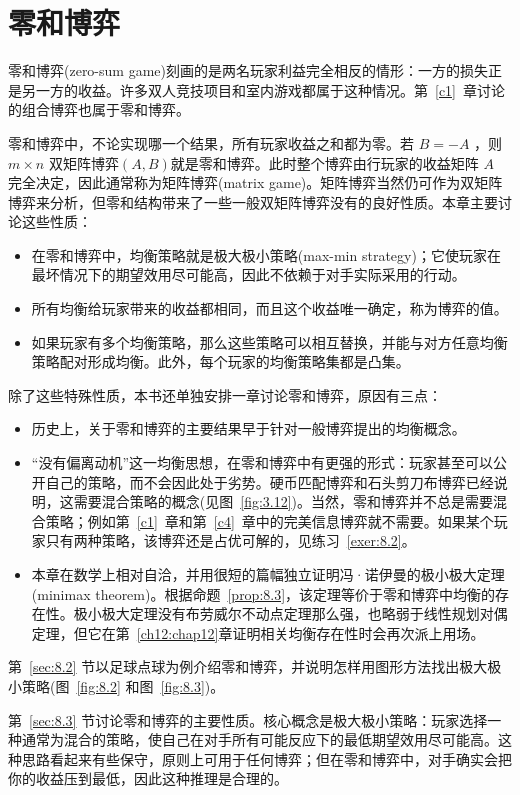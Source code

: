 \chapter{零和博弈} \label{c8}
零和博弈(zero-sum game)刻画的是两名玩家利益完全相反的情形：一方的损失正是另一方的收益。许多双人竞技项目和室内游戏都属于这种情况。第~\ref{c1}~章讨论的组合博弈也属于零和博弈。

零和博弈中，不论实现哪一个结果，所有玩家收益之和都为零。若 \(B=-A\) ，则 \(m \times  n\) 双矩阵博弈$ (A, B) $就是零和博弈。此时整个博弈由行玩家的收益矩阵 \(A\) 完全决定，因此通常称为矩阵博弈(matrix game)。矩阵博弈当然仍可作为双矩阵博弈来分析，但零和结构带来了一些一般双矩阵博弈没有的良好性质。本章主要讨论这些性质：

\begin{itemize}
\item 在零和博弈中，均衡策略就是极大极小策略(max-min strategy)；它使玩家在最坏情况下的期望效用尽可能高，因此不依赖于对手实际采用的行动。
\item 所有均衡给玩家带来的收益都相同，而且这个收益唯一确定，称为博弈的值。
\item 如果玩家有多个均衡策略，那么这些策略可以相互替换，并能与对方任意均衡策略配对形成均衡。此外，每个玩家的均衡策略集都是凸集。
\end{itemize}
除了这些特殊性质，本书还单独安排一章讨论零和博弈，原因有三点：
\begin{itemize}
\item 历史上，\citet{vonneumann1928}关于零和博弈的主要结果早于\citet{nash1951}针对一般博弈提出的均衡概念。
\item “没有偏离动机”这一均衡思想，在零和博弈中有更强的形式：玩家甚至可以公开自己的策略，而不会因此处于劣势。硬币匹配博弈和石头剪刀布博弈已经说明，这需要混合策略的概念(见图~\ref{fig:3.12})。当然，零和博弈并不总是需要混合策略；例如第~\ref{c1}~章和第~\ref{c4}~章中的完美信息博弈就不需要。如果某个玩家只有两种策略，该博弈还是占优可解的，见练习~\ref{exer:8.2}。
\item 本章在数学上相对自洽，并用很短的篇幅独立证明冯·诺伊曼的极小极大定理(minimax theorem)。根据命题~\ref{prop:8.3}，该定理等价于零和博弈中均衡的存在性。极小极大定理没有布劳威尔不动点定理那么强，也略弱于线性规划对偶定理，但它在第~\ref{ch12:chap12}章证明相关均衡存在性时会再次派上用场。
\end{itemize}

第~\ref{sec:8.2} 节以足球点球为例介绍零和博弈，并说明怎样用图形方法找出极大极小策略(图~\ref{fig:8.2} 和图~\ref{fig:8.3})。

第~\ref{sec:8.3} 节讨论零和博弈的主要性质。核心概念是极大极小策略：玩家选择一种通常为混合的策略，使自己在对手所有可能反应下的最低期望效用尽可能高。这种思路看起来有些保守，原则上可用于任何博弈；但在零和博弈中，对手确实会把你的收益压到最低，因此这种推理是合理的。

